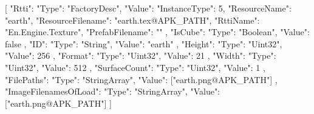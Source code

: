 [{
        "Rtti": {
            "Type": "FactoryDesc",
            "Value": {
                "InstanceType": 5,
                "ResourceName": "earth",
                "ResourceFilename": "earth.tex@APK_PATH",
                "RttiName": "En.Engine.Texture",
                "PrefabFilename": ""
            }
        },
        "IsCube": {
            "Type": "Boolean",
            "Value": false
        },
        "ID": {
            "Type": "String",
            "Value": "earth"
        },
        "Height": {
            "Type": "Uint32",
            "Value": 256
        },
        "Format": {
            "Type": "Uint32",
            "Value": 21
        },
        "Width": {
            "Type": "Uint32",
            "Value": 512
        },
        "SurfaceCount": {
            "Type": "Uint32",
            "Value": 1
        },
        "FilePaths": {
            "Type": "StringArray",
            "Value": ["earth.png@APK_PATH"]
        },
        "ImageFilenamesOfLoad": {
            "Type": "StringArray",
            "Value": ["earth.png@APK_PATH"]
        }
    }]